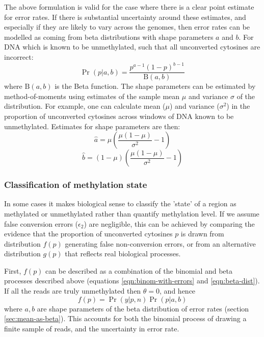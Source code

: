 \documentclass[twocolumn,twoside,lettersize]{article}
\begin{document}
The above formulation is valid for the case where there is a clear point estimate for error rates.
If there is substantial uncertainty around these estimates, and especially if they are likely to vary across the genomes, then error rates can be modelled as coming from beta distributions with shape parameters $a$ and $b$. For DNA which is known to be unmethylated, such that all unconverted cytosines are incorrect:
\begin{equation}
    \label{eqn:beta-dist}
    \Pr(p|a,b) = \frac{p^{a-1} (1-p)^{b-1}}{\textrm{B}(a,b)}
\end{equation}
where $\textrm{B}(a,b)$ is the Beta function.
The shape parameters can be estimated by method-of-moments using estimates of the sample mean $\mu$ and variance $\sigma$ of the distribution.
For example, one can calculate mean ($\mu$) and variance ($\sigma^2$) in the proportion of unconverted cytosines across windows of DNA known to be unmethylated.
Estimates for shape parameters are then:
\begin{equation}
    \hat{a} = \mu(\frac{\mu(1-\mu)}{\sigma^2}-1)
    \label{eqn:beta-a}
\end{equation}
\begin{equation}
    \hat{b} = (1-\mu)(\frac{\mu(1-\mu)}{\sigma^2}-1) 
    \label{eqn:beta-b}
\end{equation}

\subsubsection{Classification of methylation state} \label{sec:meth-state}

In some cases it makes biological sense to classify the 'state' of a region as methylated or unmethylated rather than quantify methylation level.
If we assume false conversion errors ($\epsilon_2$) are negligible, this can be achieved by comparing the evidence that the proportion of unconverted cytosines $p$ is drawn from distribution $f(p)$ generating false non-conversion errors, or from an alternative distribution $g(p)$ that reflects real biological processes.

First, $f(p)$ can be described as a combination of the binomial and beta processes described above (equations \ref{eqn:binom-with-errors} and \ref{eqn:beta-dist}).
If all the reads are truly unmethylated then $\theta=0$, and hence
\begin{equation}
    f(p) = \Pr(y | p, n) \Pr(p | a, b)
    \label{eqn:f-of-p}
\end{equation}
where $a, b$ are shape parameters of the beta distribution of error rates (section \ref{sec:mean-as-beta}).
This accounts for both the binomial process of drawing a finite sample of reads, and the uncertainty in error rate.
\end{document}

